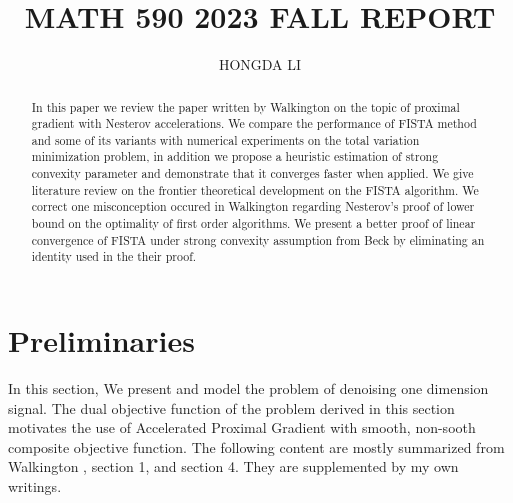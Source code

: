 \documentclass[]{article}
\title{MATH 590 2023 FALL REPORT}
\author{HONGDA LI}
\theoremstyle{definition}
\numberwithin{equation}{subsection}
\begin{document}
\maketitle

\begin{abstract}
    In this paper we review the paper written by Walkington \cite{noel_nesterovs_nodate} on the topic of proximal gradient with Nesterov accelerations. 
    We compare the performance of FISTA method and some of its variants with numerical experiments on the total variation minimization problem, in addition we propose a heuristic estimation of strong convexity parameter and demonstrate that it converges faster when applied. 
    We give literature review on the frontier theoretical development on the FISTA algorithm. 
    We correct  one misconception occured in Walkington \cite{noel_nesterovs_nodate} regarding Nesterov's proof of lower bound on the optimality of first order algorithms.  
    We present a better proof of linear convergence of FISTA under strong convexity assumption from Beck \cite[theorem 10.7.7]{beck_first-order_nodate} by eliminating an identity used in the their proof. 
\end{abstract}


\section{Preliminaries}
    In this section, We present and model the problem of denoising one dimension signal. 
    The dual objective function of the problem derived in this section motivates the use of Accelerated Proximal Gradient with smooth, non-sooth composite objective function. 
    The following content are mostly summarized from Walkington \cite{noel_nesterovs_nodate}, section 1, and section 4. They are supplemented by my own writings. 
\end{document}
